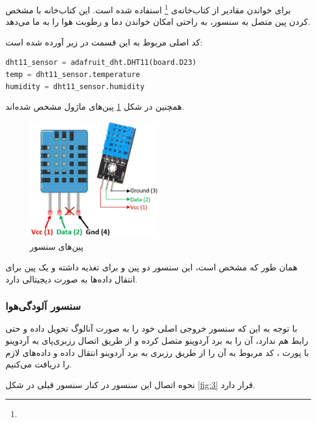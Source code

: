 برای خواندن مقادیر از کتاب‌خانه‌ی 
\footnote{}
استفاده شده است. این کتاب‌خانه با مشخص کردن پین متصل به سنسور، به راحتی امکان خواندن دما و رطوبت هوا را به ما می‌دهد.

کد اصلی مربوط به این قسمت در زیر آورده شده است:

\begin{latin}
\begin{lstlisting}[language=python]
dht11_sensor = adafruit_dht.DHT11(board.D23)
temp = dht11_sensor.temperature
humidity = dht11_sensor.humidity

\end{lstlisting}
\end{latin}

همچنین در شکل \ref{fig:13} پین‌های ماژول  مشخص شده‌اند.

\begin{figure}[h]
	\centering
	\includegraphics[width=0.5\textwidth]{figs/dht11-2.png}
	
	\caption{پین‌های سنسور }
	\label{fig:13}
\end{figure}

همان طور که مشخص است، این سنسور دو پین  و  برای تغذیه داشته و یک پین  برای انتقال داده‌ها به صورت دیجیتالی دارد.

\subsubsection{سنسور آلودگی‌هوا}

با توجه به این که  سنسور  خروجی اصلی خود را به صورت آنالوگ تحویل داده و حتی رابط  هم ندارد، آن را به برد آردوینو متصل کرده و از طریق اتصال رزبری‌پای به آردوینو با پورت ، کد مربوط به آن را از طریق رزبری به برد آردوینو انتقال داده و داده‌های لازم را دریافت می‌کنیم.

نحوه اتصال این سنسور در کنار سنسور قبلی در شکل \ref{fig:3} قرار دارد.

